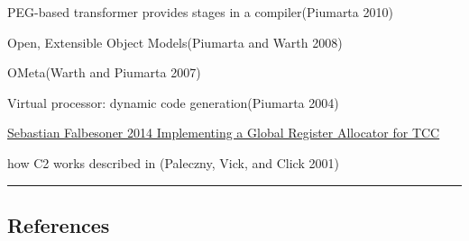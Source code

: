 PEG-based transformer provides stages in a compiler(Piumarta 2010)

Open, Extensible Object Models(Piumarta and Warth 2008)

OMeta(Warth and Piumarta 2007)

Virtual processor: dynamic code generation(Piumarta 2004)

\href{https://www.complang.tuwien.ac.at/Diplomarbeiten/falbesoner14.pdf}{Sebastian
Falbesoner 2014 Implementing a Global Register Allocator for TCC}

how C2 works described in (Paleczny, Vick, and Click 2001)

\begin{center}\rule{0.5\linewidth}{0.5pt}\end{center}

\hypertarget{references}{%
\subsection*{References}\label{references}}

